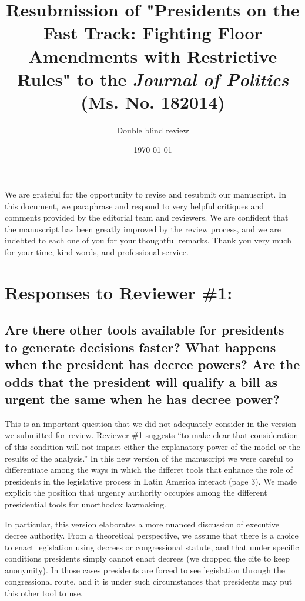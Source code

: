 \documentclass[article,letterpaper,times,12pt,listings-bw,microtype]{article}
\author{Double blind review}
\date{\today}
\title{Resubmission of "Presidents on the Fast Track: Fighting Floor Amendments with Restrictive Rules" to the \emph{Journal of Politics} (Ms. No. 182014)}
\begin{document}
\maketitle


\noindent
We are grateful for the opportunity to revise and resubmit our manuscript. In this document, we paraphrase and respond to very helpful critiques and comments provided by the editorial team and reviewers. We are confident that the manuscript has been greatly improved by the review process, and we are indebted to each one of you for your thoughtful remarks. Thank you very much for your time, kind words, and professional service. 

\section{Responses to Reviewer \#1:}
\subsection {Are there other tools available for presidents to generate decisions faster? What happens when the president has decree powers? Are the odds that the president will qualify a bill as urgent the same when he has decree power?} 

This is an important question that we did not adequately consider in the version we submitted for review. Reviewer \#1 suggests ``to make clear that consideration of this condition will not impact either the explanatory power of the model or the results of the analysis.'' In this new version of the manuscript we were careful  to differentiate among the ways in which the differet tools that enhance the role of presidents in the legislative process in Latin America interact (page 3). We made explicit the position that urgency authority occupies among the different presidential tools for unorthodox lawmaking.

In particular, this version elaborates a more nuanced discussion of executive decree authority. From a theoretical perspective, we assume that there is a choice to enact legislation using decrees or congressional statute, and that under specific conditions presidents simply cannot enact decrees (we dropped the cite to keep anonymity). In those cases presidents are forced to see legislation through the congressional route, and it is under such circumstances that presidents may put this other tool to use. 
\end{document}
